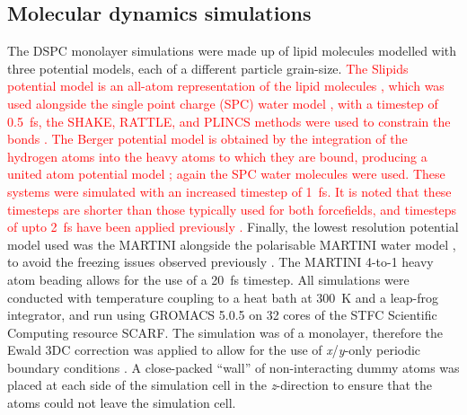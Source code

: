 \documentclass[amsmath,amssymb,twocolumn,superscriptaddress]{revtex4-1}
\begin{document}
\subsection{Molecular dynamics simulations}
The DSPC monolayer simulations were made up of lipid molecules modelled with
three potential models, each of a different particle grain-size.
\textcolor{red}{The Slipids potential model is an all-atom representation of the lipid
molecules \cite{jambeck_derivation_2012}, which was used alongside the single
point charge (SPC) water model \cite{berendsen_missing_1987}, with a timestep
of \SI{0.5}{\femto\second}, the SHAKE, RATTLE, and PLINCS methods were used
to constrain the  bonds \cite{miyamoto_settle_1992,hess_p-lincs_2008}.
The Berger potential model is obtained by the integration of the hydrogen
atoms into the heavy atoms to which they are bound, producing a united atom
potential model \cite{berger_molecular_1997};
again the SPC water molecules were used.
These systems were simulated with an increased timestep of
\SI{1}{\femto\second}.
It is noted that these timesteps are shorter than those typically used for
both forcefields, and timesteps of upto \SI{2}{\femto\second} have been
applied previously \cite{berger_molecular_1997,jambeck_derivation_2012}.}
Finally, the lowest resolution potential model used was the
MARTINI \cite{marrink_martini_2007} alongside the polarisable MARTINI water
model \cite{yesylevskyy_polarizable_2010}, to avoid the freezing issues
observed previously \cite{koutsioubas_combined_2016}.
The MARTINI 4-to-1 heavy atom beading allows for the use of
a \SI{20}{\femto\second} timestep.
All simulations were conducted with temperature coupling to a heat bath
at \SI{300}{\kelvin} and a leap-frog integrator, and run using GROMACS
5.0.5 \cite{berendsen_gromacs_1995,lindahl_gromacs_2001,
van_der_spoel_gromacs_2005,hess_gromacs_2008} on 32 cores of the STFC
Scientific Computing resource SCARF.
The simulation was of a monolayer, therefore the Ewald 3DC correction was
applied to allow for the use of \emph{x}/\emph{y}-only periodic boundary
conditions \cite{yeh_ewald_1999}.
A close-packed ``wall'' of non-interacting dummy atoms was placed at each
side of the simulation cell in the \emph{z}-direction to ensure that the
atoms could not leave the simulation cell.
\end{document}
